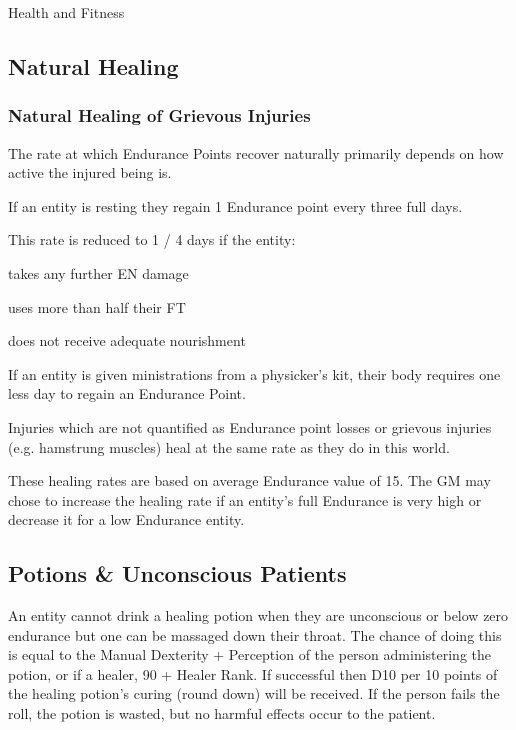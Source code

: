 \begin{Chapter}{Health and Fitness}
\subsection{Natural Healing}

\subsubsection{Natural Healing of Grievous Injuries}

The rate at which Endurance Points recover naturally primarily depends
on how active the injured being is.

If an entity is resting they regain 1 Endurance point every three full
days.

This rate is reduced to 1 / 4 days if the entity:

\begin{Itemize}

\item takes any further EN damage  

\item uses more than half their FT  

\item does not receive adequate nourishment 

\end{Itemize}
  
If an entity is given ministrations from a physicker’s kit, their body
requires one less day to regain an Endurance Point.

Injuries which are not quantified as Endurance point losses or
grievous injuries (e.g.  hamstrung muscles) heal at the same rate as
they do in this world.

These healing rates are based on average Endurance value of 15.  The
GM may chose to increase the healing rate if an entity’s full
Endurance is very high or decrease it for a low Endurance entity.

\subsection{Potions \& Unconscious Patients}

An entity cannot drink a healing potion when they are unconscious or
below zero endurance but one can be massaged down their throat. The
chance of doing this is equal to the Manual Dexterity + Perception of
the person administering the potion, or if a healer, 90 + Healer
Rank. If successful then D10 per 10 points of the healing potion’s
curing (round down) will be received. If the person fails the roll,
the potion is wasted, but no harmful effects occur to the patient.


\end{Chapter}
